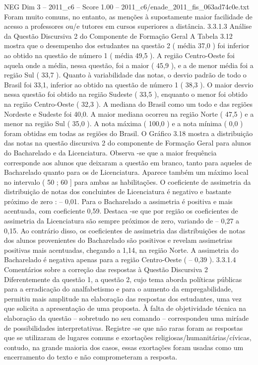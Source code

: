 \begin{textsample}{NEG Dim 3 – 2011\_c6 – Score 1.00 – 2011\_c6/enade\_2011\_fis\_063ad74c0e.txt}
Foram muito comuns, no entanto, as menções à supostamente maior facilidade de acesso a professores ou/e tutores em cursos superiores a distância. 3.3.1.3 Análise da Questão Discursiva 2 do Componente de Formação Geral A Tabela 3.12 mostra que o desempenho dos estudantes na questão 2 ( média 37,0 ) foi inferior ao obtido na questão de número 1 ( média 49,5 ).
A região Centro-Oeste foi aquela onde a média, nessa questão, foi a maior ( 45,9 ), e a de menor média foi a região Sul ( 33,7 ).
Quanto à variabilidade das notas, o desvio padrão de todo o Brasil foi 33,1, inferior ao obtido na questão de número 1 ( 38,3 ).
O maior desvio nessa questão foi obtido na região Sudeste ( 33,5 ), enquanto o menor foi obtido na região Centro-Oeste ( 32,3 ).
A mediana do Brasil como um todo e das regiões Nordeste e Sudeste foi 40,0.
A maior mediana ocorreu na região Norte ( 47,5 ) e a menor na região Sul ( 35,0 ).
A nota máxima ( 100,0 ) e a nota mínima ( 0,0 ) foram obtidas em todas as regiões do Brasil.
O Gráfico 3.18 mostra a distribuição das notas na questão discursiva 2 do componente de Formação Geral para alunos do Bacharelado e da Licenciatura.
Observa -se que a maior frequência corresponde aos alunos que deixaram a questão em branco, tanto para aqueles de Bacharelado quanto para os de Licenciatura.
Aparece também um máximo local no intervalo ( 50 ; 60 ] para ambas as habilitações.
O coeficiente de assimetria da distribuição de notas dos concluintes de Licenciatura é negativo e bastante próximo de zero : – 0,01.
Para o Bacharelado a assimetria é positiva e mais acentuada, com coeficiente 0,59.
Destaca -se que por região os coeficientes de assimetria da Licenciatura são sempre próximos de zero, variando de – 0,27 a 0,15.
Ao contrário disso, os coeficientes de assimetria das distribuições de notas dos alunos provenientes do Bacharelado são positivos e revelam assimetrias positivas mais acentuadas, chegando a 1,14, na região Norte.
A assimetria do Bacharelado é negativa apenas para a região Centro-Oeste ( – 0,39 ). 3.3.1.4 Comentários sobre a correção das respostas à Questão Discursiva 2 Diferentemente da questão 1, a questão 2, cujo tema aborda políticas públicas para a erradicação do analfabetismo e para o aumento da empregabilidade, permitiu mais amplitude na elaboração das respostas dos estudantes, uma vez que solicita a apresentação de uma proposta.
À falta de objetividade técnica na elaboração da questão – sobretudo no seu comando – correspondeu uma miríade de possibilidades interpretativas.
Registre -se que não raras foram as respostas que se utilizaram de lugares comuns e exortações religiosas/humanitárias/cívicas, contudo, na grande maioria dos casos, essas exortações foram usadas como um encerramento do texto e não comprometeram a resposta.

\end{textsample}
